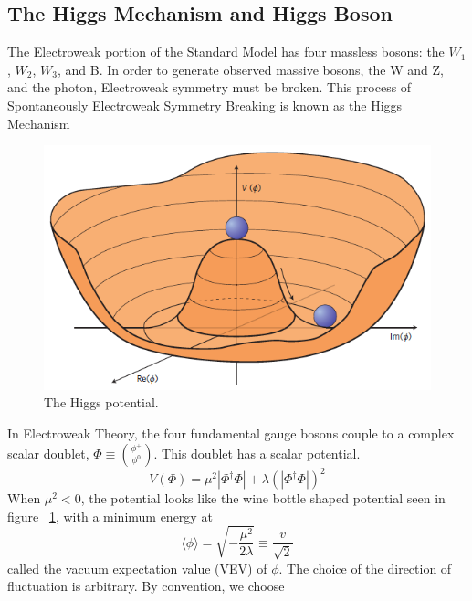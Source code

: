 \subsection{The Higgs Mechanism and Higgs Boson}
\label{ssec:Higgs}
The Electroweak portion of the Standard Model has four massless bosons: the $W_{1}$, $W_{2}$, $W_{3}$, and B. In order to generate observed massive bosons, the W and Z, and the photon, Electroweak symmetry must be broken. This process of Spontaneously Electroweak Symmetry Breaking is known as the Higgs Mechanism\newline

\begin{figure}[h]
\begin{center}
\includegraphics[scale=0.65]{figures/higgspotential}
\caption[The Higgs potential]{The Higgs potential.\cite{Ellis:1638469}}
\label{Fig:higgspot}
\end{center}
\end{figure}

\indent In Electroweak Theory, the four fundamental gauge bosons couple to a complex scalar doublet, ${\Phi \equiv \binom{\phi^{+}}{\phi^{0}}}$. This doublet has a scalar potential.
\begin{equation}
\label{eq:higgsPot}
V(\Phi) = \mu^{2}|\Phi^{\dagger}\Phi| + \lambda(|\Phi^{\dagger}\Phi|)^{2}
\end{equation}
When ${\mu^{2} < 0}$, the potential looks like the wine bottle shaped potential seen in figure ~\ref{Fig:higgspot}, with a minimum energy at 
\begin{equation}
\langle \phi \rangle = \sqrt{-\frac{\mu^{2}}{2\lambda}}\equiv \frac{v}{\sqrt{2}}
\end{equation}
called the vacuum expectation value (VEV) of ${\phi}$. The choice of the direction of fluctuation is arbitrary. By convention, we choose



